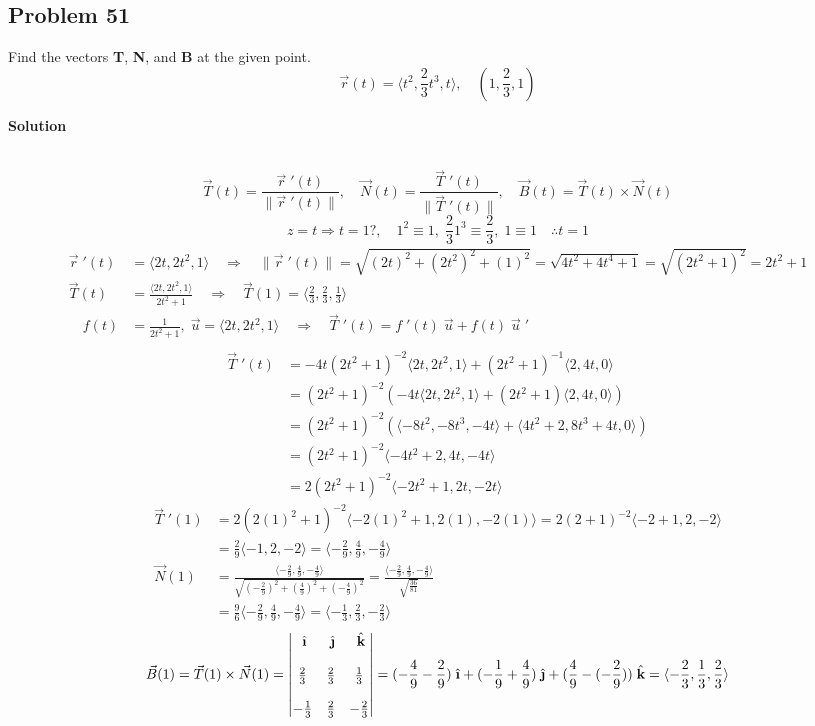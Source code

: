 \documentclass{article}
\newcommand{\ihat}{\;\hat{\textbf{\i}}}
\newcommand{\jhat}{\;\hat{\textbf{\j}}}
\newcommand{\khat}{\;\hat{\textbf{k}}}
\newcommand{\rvec}{\vec{r}(t)}
\newcommand{\drvec}{\vec{r}\;'(t)}
\newcommand\vv[1]{\langle #1 \rangle}
\newcommand\vc[2]{\vec{#1}(#2)}
\newcommand\vcd[2]{\vec{#1}\;'(#2)}
\newcommand\mgv[1]{\|#1\|}
\newcommand\mgvvv[3]{\sqrt{\left(#1\right)^2 + \left(#2\right)^2 + \left(#3\right)^2}}
\newcommand\rr{\quad\Rightarrow\quad}
\begin{document}
\subsection*{Problem 51}
Find the vectors \textbf{T}, \textbf{N}, and \textbf{B} at the given point.
\[
    \rvec = \langle{t^2, \frac{2}{3}t^3, t}\rangle, \quad (1, \frac{2}{3}, 1)
\]
\centerline{\textbf{Solution}} \\
\[
    \vc T t = \frac{\drvec}{\|\drvec\|}, \quad \vc N t = \frac{\vec T\;'(t)}{\|\vec T\;'(t)\|}, \quad \vc B t = \vc T t \times \vc N t
\]
\[
    z = t \Rightarrow t = 1?, \quad 1^2 \equiv 1,\; \frac 2 3 1^3 \equiv \frac 2 3,\; 1 \equiv 1 \quad \therefore t= 1
\]
\begin{align*}
    \vcd r t &= \vv{2t, 2t^2, 1} \rr \mgv{\vcd r t} = \mgvvv{2t}{2t^2}{1} = \sqrt{4t^2 + 4t^4 + 1} = \sqrt{(2t^2 + 1)^2} = 2t^2 + 1 \\
    \vc T t &= \frac{\vv{2t, 2t^2, 1}}{2t^2+1} \rr \vc T 1 = \vv{\frac 2 3, \frac 2 3, \frac 1 3} \\ 
    \quad f(t) &= \frac{1}{2t^2 + 1}, \; \vec u = \vv{2t, 2t^2, 1} \rr \vcd T t = f\;'(t)\;\vec u + f(t)\;\vec u\;' \\
\end{align*}
\begin{align*}
    \vcd T t &= -4t(2t^2+1)^{-2}\vv{2t,2t^2,1} + (2t^2+1)^{-1}\vv{2,4t,0} \\ 
             &= (2t^2+1)^{-2}(-4t\vv{2t, 2t^2, 1}+(2t^2+1)\vv{2,4t,0}) \\
             &= (2t^2+1)^{-2}(\vv{-8t^2,-8t^3,-4t}+\vv{4t^2+2,8t^3+4t,0}) \\
             &= (2t^2 + 1)^{-2}\vv{-4t^2 + 2, 4t, -4t} \\
             &= 2(2t^2+1)^{-2}\vv{-2t^2+1, 2t, -2t} 
\end{align*}
\begin{align*}
    \vcd T 1 &= 2(2(1)^2+1)^{-2}\vv{-2(1)^2+1, 2(1), -2(1)} = 2(2+1)^{-2}\vv{-2+1, 2, -2} \\ 
             &= \frac 2 9 \vv{-1, 2, -2} = \vv{-\frac{2}{9}, \frac 4 9, -\frac 4 9} \\
    \vc N 1 &= \frac{\vv{-\frac 2 9, \frac 4 9, -\frac 4 9 }}{\mgvvv{-\frac 2 9}{\frac 4 9}{-\frac 4 9}} = \frac{\vv{-\frac 2 9, \frac 4 9, -\frac 4 9 }}{\sqrt{\frac{36}{81}}} \\ 
            &= \frac 9 6\vv{-\frac 2 9, \frac 4 9, -\frac 4 9} = \vv{-\frac 1 3, \frac 2 3, -\frac 2 3}
\end{align*}
\begin{align*}
    \vc B 1 = \vc T 1 \times \vc N 1 =
    \begin{vmatrix}
        \ihat & \jhat & \khat \\ 
        \\
        \frac 2 3 & \frac 2 3 & \frac 1 3 \\ 
        \\
        -\frac 1 3 & \frac 2 3 & -\frac 2 3
    \end{vmatrix} = (-\frac 4 9 - \frac 2 9)\ihat + (-\frac 1 9 + \frac 4 9)\jhat + (\frac 4 9 - (-\frac 2 9))\khat = \vv{-\frac 2 3, \frac 1 3, \frac 2 3}
\end{align*}
\end{document}
